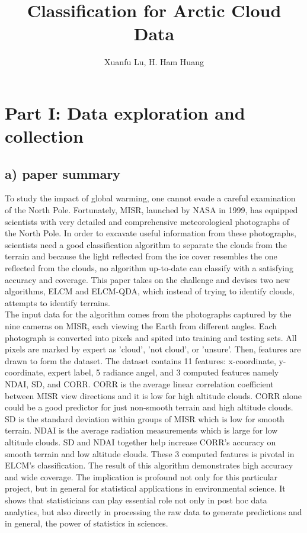 \documentclass[jou]{apa}%
\title{Classification for Arctic Cloud Data}
\author{Xuanfu Lu, H. Ham Huang}
\affiliation{Statistics 154 \\ Project 2}
\begin{document}
\maketitle   
\section{\textbf{Part I: Data exploration and collection}}
\subsection{a) paper summary}
To study the impact of global warming, one cannot evade a careful examination of the North Pole. Fortunately, MISR, launched by NASA in 1999, has equipped scientists with very detailed and comprehensive meteorological photographs of the North Pole. In order to excavate useful information from these photographs, scientists need a good classification algorithm to separate the clouds from the terrain and because the light reflected from the ice cover resembles the one reflected from the clouds, no algorithm up-to-date can classify with a satisfying accuracy and coverage. This paper takes on the challenge and devises two new algorithms, ELCM and ELCM-QDA, which instead of trying to identify clouds, attempts to identify terrains.\\
\indent The input data for the algorithm comes from the photographs captured by the nine cameras on MISR, each viewing the Earth from different angles. Each photograph is converted into pixels and spited into training and testing sets. All pixels are marked by expert as 'cloud', 'not cloud', or 'unsure'. Then, features are drawn to form the dataset. The dataset contains 11 features: x-coordinate, y-coordinate, expert label, 5 radiance angel, and 3 computed features namely NDAI, SD, and CORR. CORR is the average linear correlation coefficient between MISR view directions and it is low for high altitude clouds. CORR alone could be a good predictor for just non-smooth terrain and high altitude clouds. SD is the standard deviation within groups of MISR which is low for smooth terrain. NDAI is the average radiation measurements which is large for low altitude clouds. SD and NDAI together help increase CORR's accuracy on smooth terrain and low altitude clouds. These 3 computed features is pivotal in ELCM's classification. 			The result of this algorithm demonstrates high accuracy and wide coverage. The implication is profound not only for this particular project, but in general for statistical applications in environmental science. It shows that statisticians can play essential role not only in post hoc data analytics, but also directly in processing the raw data to generate predictions and in general, the power of statistics in sciences.
\end{document}
